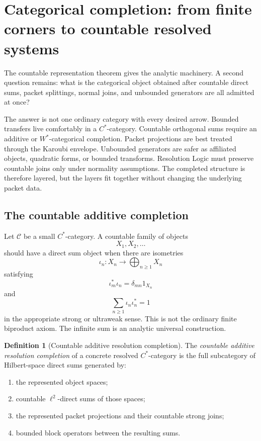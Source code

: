 \documentclass[11pt]{article}
\theoremstyle{definition}
\newtheorem{definition}[theorem]{Definition}
\theoremstyle{remark}
\begin{document}
\section{Categorical completion: from finite corners to countable resolved systems}
\label{sec:categorical-completion}

The countable representation theorem gives the analytic machinery.  A second question remains: what is the categorical object obtained after countable direct sums, packet splittings, normal joins, and unbounded generators are all admitted at once?

The answer is not one ordinary category with every desired arrow.  Bounded transfers live comfortably in a $C^*$-category.  Countable orthogonal sums require an additive or $W^*$-categorical completion.  Packet projections are best treated through the Karoubi envelope.  Unbounded generators are safer as affiliated objects, quadratic forms, or bounded transforms.  Resolution Logic must preserve countable joins only under normality assumptions.  The completed structure is therefore layered, but the layers fit together without changing the underlying packet data.

\subsection{The countable additive completion}

Let $\mathcal C$ be a small $C^*$-category.  A countable family of objects
\[
X_1,X_2,\ldots
\]
should have a direct sum object when there are isometries
\[
\iota_n:X_n\to\bigoplus_{n\ge1}X_n
\]
satisfying
\[
\iota_m^*\iota_n=\delta_{mn}1_{X_n}
\]
and
\[
\sum_{n\ge1}\iota_n\iota_n^*=1
\]
in the appropriate strong or ultraweak sense.  This is not the ordinary finite biproduct axiom.  The infinite sum is an analytic universal construction.

\begin{definition}[Countable additive resolution completion]
The \emph{countable additive resolution completion} of a concrete resolved $C^*$-category is the full subcategory of Hilbert-space direct sums generated by:
\begin{enumerate}[label=\textup{(\roman*)}]
\item the represented object spaces;
\item countable $\ell^2$-direct sums of those spaces;
\item the represented packet projections and their countable strong joins;
\item bounded block operators between the resulting sums.
\end{enumerate}
\end{definition}
\end{document}
